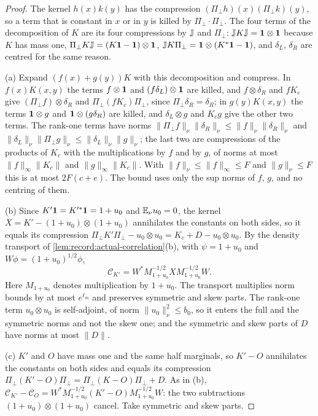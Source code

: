 \begin{proof}
The kernel $h(x)k(y)$ has the compression $(\Pi_\perp h)(x)(\Pi_\perp k)(y)$, so
a term that is constant in $x$ or in $y$ is killed by $\Pi_\perp\cdot\Pi_\perp$.
The four terms of the decomposition of $K$ are its four compressions by $\mathbb J$
and $\Pi_\perp$: $\mathbb J K\mathbb J=\mathbf 1\otimes\mathbf 1$ because $K$ has mass one,
$\Pi_\perp K\mathbb J=(K\mathbf 1-\mathbf 1)\otimes\mathbf 1$, $\mathbb J K\Pi_\perp=\mathbf 1\otimes(K^*\mathbf 1-\mathbf 1)$,
and $\delta_L$, $\delta_R$ are centred for the same reason.

(a) Expand $(f(x)+g(y))K$ with this decomposition and compress. In
$f(x)K(x,y)$ the terms $f\otimes\mathbf 1$ and $(f\delta_L)\otimes\mathbf 1$ are killed, and
$f\otimes\delta_R$ and $fK_c$ give $(\Pi_\perp f)\otimes\delta_R$ and
$\Pi_\perp(fK_c)\Pi_\perp$, since $\Pi_\perp\delta_R=\delta_R$; in $g(y)K(x,y)$
the terms $\mathbf 1\otimes g$ and $\mathbf 1\otimes(g\delta_R)$ are killed, and
$\delta_L\otimes g$ and $K_cg$ give the other two terms. The rank-one terms have
norms $\|\Pi_\perp f\|_\nu\|\delta_R\|_\nu\le\|f\|_\nu\|\delta_R\|_\nu$ and
$\|\delta_L\|_\nu\|\Pi_\perp g\|_\nu\le\|\delta_L\|_\nu\|g\|_\nu$; the last two are
compressions of the products of $K_c$ with the multiplications by $f$ and by
$g$, of norms at most $\|f\|_\infty\|K_c\|$ and $\|g\|_\infty\|K_c\|$. With
$\|f\|_\nu\le\|f\|_\infty\le F$ and $\|g\|_\nu\le F$ this is at most $2F(c+e)$.
The bound uses only the sup norms of $f$, $g$, and no centring of them.

(b) Since $K'\mathbf 1=K'^*\mathbf 1=1+u_0$ and $\mathbb E_\nu u_0=0$, the kernel
$X=K'-(1+u_0)\otimes(1+u_0)$ annihilates the constants on both sides, so it equals
its compression
$\Pi_\perp K'\Pi_\perp-u_0\otimes u_0=K_c+D-u_0\otimes u_0$. By the density transport of \cref{lem:record:actual-correlation}(b), with
$\psi=1+u_0$ and $W\phi=(1+u_0)^{1/2}\phi$,
\[
 \mathcal C_{K'}=W^*M_{1+u_0}^{-1/2}XM_{1+u_0}^{-1/2}W.
\]
Here $M_{1+u_0}$ denotes multiplication by $1+u_0$. The transport multiplies
norm bounds by at most $e^{\ell_m}$ and preserves symmetric and skew parts.
The rank-one term $u_0\otimes u_0$ is self-adjoint, of norm $\|u_0\|_\nu^2\le b_0$,
so it enters the full and the symmetric norms and not the skew one; and the
symmetric and skew parts of $D$ have norms at most $\|D\|$.

(c) $K'$ and $O$ have mass one and the same half marginals, so $K'-O$
annihilates the constants on both sides and equals its compression
$\Pi_\perp(K'-O)\Pi_\perp=\Pi_\perp(K-O)\Pi_\perp+D$. As in (b),
$\mathcal C_{K'}-\mathcal C_O=W^*M_{1+u_0}^{-1/2}(K'-O)M_{1+u_0}^{-1/2}W$: the two
subtractions
$(1+u_0)\otimes(1+u_0)$ cancel. Take symmetric and skew parts.
\end{proof}

